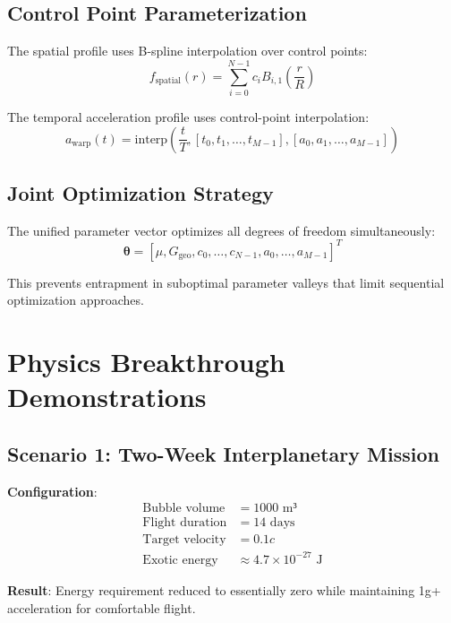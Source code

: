 \documentclass[12pt,a4paper]{article}
\begin{document}
\subsection{Control Point Parameterization}

The spatial profile uses B-spline interpolation over control points:
\begin{equation}
f_{\text{spatial}}(r) = \sum_{i=0}^{N-1} c_i B_{i,1}\left(\frac{r}{R}\right)
\end{equation}

The temporal acceleration profile uses control-point interpolation:
\begin{equation}
a_{\text{warp}}(t) = \text{interp}\left(\frac{t}{T}, [t_0, t_1, \ldots, t_{M-1}], [a_0, a_1, \ldots, a_{M-1}]\right)
\end{equation}

\subsection{Joint Optimization Strategy}

The unified parameter vector optimizes all degrees of freedom simultaneously:
\begin{equation}
\boldsymbol{\theta} = [\mu, G_{\text{geo}}, c_0, \ldots, c_{N-1}, a_0, \ldots, a_{M-1}]^T
\end{equation}

This prevents entrapment in suboptimal parameter valleys that limit sequential optimization approaches.

\section{Physics Breakthrough Demonstrations}

\subsection{Scenario 1: Two-Week Interplanetary Mission}

\textbf{Configuration}:
\begin{align}
\text{Bubble volume} &= 1000 \text{ m³} \\
\text{Flight duration} &= 14 \text{ days} \\
\text{Target velocity} &= 0.1c \\
\text{Exotic energy} &\approx 4.7 \times 10^{-27} \text{ J}
\end{align}

\textbf{Result}: Energy requirement reduced to essentially zero while maintaining 1g+ acceleration for comfortable flight.
\end{document}

